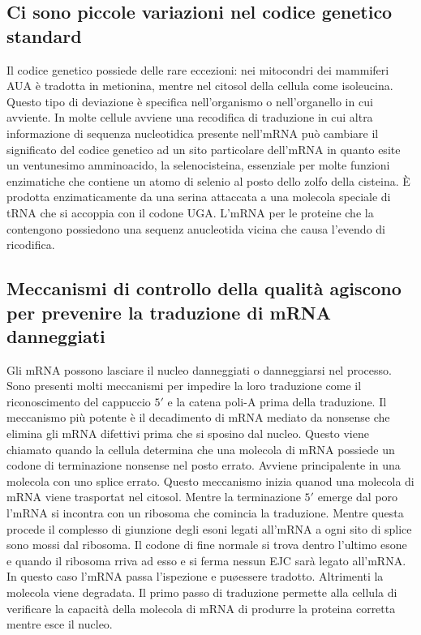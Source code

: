 \subsection{Ci sono piccole variazioni nel codice genetico standard}
Il codice genetico possiede delle rare eccezioni: nei mitocondri dei mammiferi AUA \`e tradotta in metionina, mentre nel citosol della cellula come isoleucina. Questo tipo di deviazione
\`e specifica nell'organismo o nell'organello in cui avviente. In molte cellule avviene una recodifica di traduzione in cui altra informazione di sequenza nucleotidica presente 
nell'mRNA pu\`o cambiare il significato del codice genetico ad un sito particolare dell'mRNA in quanto esite un ventunesimo amminoacido, la selenocisteina, essenziale per molte funzioni
enzimatiche che contiene un atomo di selenio al posto dello zolfo della cisteina. \`E prodotta enzimaticamente da una serina attaccata a una molecola speciale di tRNA che si accoppia 
con il codone UGA. L'mRNA per le proteine che la contengono possiedono una sequenz anucleotida vicina che causa l'evendo di ricodifica. 
\subsection{Meccanismi di controllo della qualit\`a agiscono per prevenire la traduzione di mRNA danneggiati}
Gli mRNA possono lasciare il nucleo danneggiati o danneggiarsi nel processo. Sono presenti molti meccanismi per impedire la loro traduzione come il riconoscimento del cappuccio $5'$ e 
la catena poli-A prima della traduzione. Il meccanismo pi\`u potente \`e il decadimento di mRNA mediato da nonsense che elimina gli mRNA difettivi prima che si sposino dal nucleo. Questo
viene chiamato quando la cellula determina che una molecola di mRNA possiede un codone di terminazione nonsense nel posto errato. Avviene principalente in una molecola con uno splice
errato. Questo meccanismo inizia quanod una molecola di mRNA viene trasportat nel citosol. Mentre la terminazione $5'$ emerge dal poro l'mRNA si incontra con un ribosoma che comincia 
la traduzione. Mentre questa procede il complesso di giunzione degli esoni legati all'mRNA a ogni sito di splice sono mossi dal ribosoma. Il codone di fine normale si trova dentro 
l'ultimo esone e quando il ribosoma rriva ad esso e si ferma nessun EJC sar\`a legato all'mRNA. In questo caso l'mRNA passa l'ispezione e pu\o essere tradotto. Altrimenti la molecola
viene degradata. Il primo passo di traduzione permette alla cellula di verificare la capacit\` a della molecola di mRNA di produrre la proteina corretta mentre esce il nucleo. 
